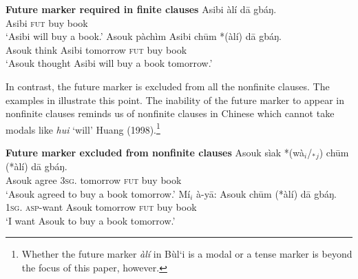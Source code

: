 \documentclass[output=paper,colorlinks,citecolor=brown]{langscibook}
\begin{document}
\ea%
    \label{ex:sulemana:8}
    {\bf{Future marker required in finite clauses}}
    \ea%
    \label{ex:sulemana:8a}
    \gll    Asibi àlí dā gbáŋ.\\
            Asibi \textsc{fut} buy book\\
    \glt    `Asibi will buy a book.'
    \ex%
    \label{ex:sulemana:8b}
    \gll    Asouk pàchìm Asibi chūm *(àlí) dā gbáŋ.\\
            Asouk think Asibi tomorrow \textsc{fut}  buy book\\
    \glt    `Asouk thought Asibi will buy a book tomorrow.' 
    \z
\z

In contrast, the future marker is excluded from all the nonfinite clauses. The examples in  illustrate this point. The inability of the future marker to appear in nonfinite clauses reminds us of nonfinite clauses in Chinese which cannot take modals like {\it{hui}} `will' Huang (1998).\footnote{Whether the future marker {\it{àlí}} in Bùl`i is a modal or a tense marker is beyond the focus of this paper, however.} 

\ea%
    \label{ex:sulemana:9}
    {\bf{Future marker excluded from nonfinite clauses}}
    \ea%
    \label{ex:sulemana:9a}
    \gll    Asouk sìak *(wà$_i$/$_*${}$_j$) chūm (*àlí) dā gbáŋ.\\
            Asouk agree \textsc{3sg}. tomorrow \textsc{fut} buy book\\
    \glt    `Asouk agreed to buy a book tomorrow.'
    \ex%
    \label{ex:sulemana:9b}
    \gll    Mí$_i$ à-yā: Asouk chūm (*àlí) dā gbáŋ.\\
            \textsc{1sg}. \textsc{asp}-want Asouk  tomorrow \textsc{fut}  buy book\\
    \glt    `I want Asouk to buy a book tomorrow.' 
    \z
\z
\end{document}
